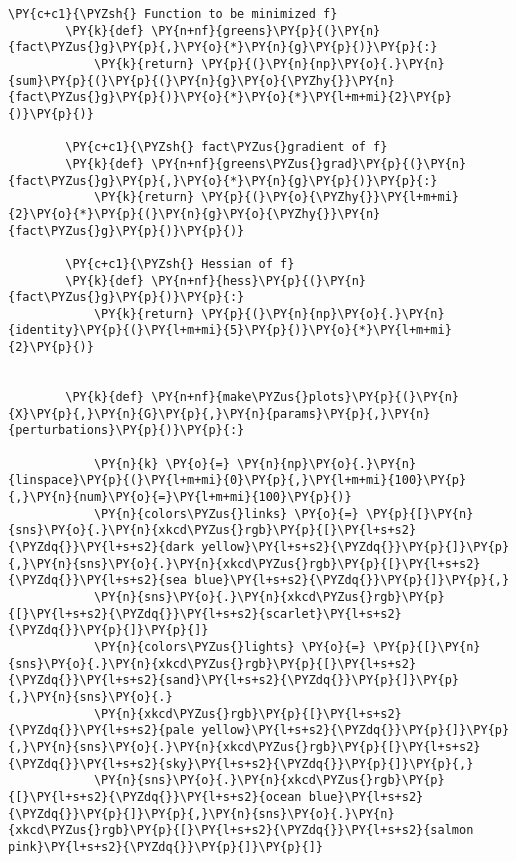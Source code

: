 \begin{Verbatim}[commandchars=\\\{\}]
        \PY{c+c1}{\PYZsh{} Function to be minimized f}
        \PY{k}{def} \PY{n+nf}{greens}\PY{p}{(}\PY{n}{fact\PYZus{}g}\PY{p}{,}\PY{o}{*}\PY{n}{g}\PY{p}{)}\PY{p}{:}
            \PY{k}{return} \PY{p}{(}\PY{n}{np}\PY{o}{.}\PY{n}{sum}\PY{p}{(}\PY{p}{(}\PY{n}{g}\PY{o}{\PYZhy{}}\PY{n}{fact\PYZus{}g}\PY{p}{)}\PY{o}{*}\PY{o}{*}\PY{l+m+mi}{2}\PY{p}{)}\PY{p}{)}
        
        \PY{c+c1}{\PYZsh{} fact\PYZus{}gradient of f}
        \PY{k}{def} \PY{n+nf}{greens\PYZus{}grad}\PY{p}{(}\PY{n}{fact\PYZus{}g}\PY{p}{,}\PY{o}{*}\PY{n}{g}\PY{p}{)}\PY{p}{:}
            \PY{k}{return} \PY{p}{(}\PY{o}{\PYZhy{}}\PY{l+m+mi}{2}\PY{o}{*}\PY{p}{(}\PY{n}{g}\PY{o}{\PYZhy{}}\PY{n}{fact\PYZus{}g}\PY{p}{)}\PY{p}{)}
        
        \PY{c+c1}{\PYZsh{} Hessian of f}
        \PY{k}{def} \PY{n+nf}{hess}\PY{p}{(}\PY{n}{fact\PYZus{}g}\PY{p}{)}\PY{p}{:}
            \PY{k}{return} \PY{p}{(}\PY{n}{np}\PY{o}{.}\PY{n}{identity}\PY{p}{(}\PY{l+m+mi}{5}\PY{p}{)}\PY{o}{*}\PY{l+m+mi}{2}\PY{p}{)}
        
        
        \PY{k}{def} \PY{n+nf}{make\PYZus{}plots}\PY{p}{(}\PY{n}{X}\PY{p}{,}\PY{n}{G}\PY{p}{,}\PY{n}{params}\PY{p}{,}\PY{n}{perturbations}\PY{p}{)}\PY{p}{:}
            
            \PY{n}{k} \PY{o}{=} \PY{n}{np}\PY{o}{.}\PY{n}{linspace}\PY{p}{(}\PY{l+m+mi}{0}\PY{p}{,}\PY{l+m+mi}{100}\PY{p}{,}\PY{n}{num}\PY{o}{=}\PY{l+m+mi}{100}\PY{p}{)}
            \PY{n}{colors\PYZus{}links} \PY{o}{=} \PY{p}{[}\PY{n}{sns}\PY{o}{.}\PY{n}{xkcd\PYZus{}rgb}\PY{p}{[}\PY{l+s+s2}{\PYZdq{}}\PY{l+s+s2}{dark yellow}\PY{l+s+s2}{\PYZdq{}}\PY{p}{]}\PY{p}{,}\PY{n}{sns}\PY{o}{.}\PY{n}{xkcd\PYZus{}rgb}\PY{p}{[}\PY{l+s+s2}{\PYZdq{}}\PY{l+s+s2}{sea blue}\PY{l+s+s2}{\PYZdq{}}\PY{p}{]}\PY{p}{,}
            \PY{n}{sns}\PY{o}{.}\PY{n}{xkcd\PYZus{}rgb}\PY{p}{[}\PY{l+s+s2}{\PYZdq{}}\PY{l+s+s2}{scarlet}\PY{l+s+s2}{\PYZdq{}}\PY{p}{]}\PY{p}{]}
            \PY{n}{colors\PYZus{}lights} \PY{o}{=} \PY{p}{[}\PY{n}{sns}\PY{o}{.}\PY{n}{xkcd\PYZus{}rgb}\PY{p}{[}\PY{l+s+s2}{\PYZdq{}}\PY{l+s+s2}{sand}\PY{l+s+s2}{\PYZdq{}}\PY{p}{]}\PY{p}{,}\PY{n}{sns}\PY{o}{.}
            \PY{n}{xkcd\PYZus{}rgb}\PY{p}{[}\PY{l+s+s2}{\PYZdq{}}\PY{l+s+s2}{pale yellow}\PY{l+s+s2}{\PYZdq{}}\PY{p}{]}\PY{p}{,}\PY{n}{sns}\PY{o}{.}\PY{n}{xkcd\PYZus{}rgb}\PY{p}{[}\PY{l+s+s2}{\PYZdq{}}\PY{l+s+s2}{sky}\PY{l+s+s2}{\PYZdq{}}\PY{p}{]}\PY{p}{,}
            \PY{n}{sns}\PY{o}{.}\PY{n}{xkcd\PYZus{}rgb}\PY{p}{[}\PY{l+s+s2}{\PYZdq{}}\PY{l+s+s2}{ocean blue}\PY{l+s+s2}{\PYZdq{}}\PY{p}{]}\PY{p}{,}\PY{n}{sns}\PY{o}{.}\PY{n}{xkcd\PYZus{}rgb}\PY{p}{[}\PY{l+s+s2}{\PYZdq{}}\PY{l+s+s2}{salmon pink}\PY{l+s+s2}{\PYZdq{}}\PY{p}{]}\PY{p}{]}
            

\end{Verbatim}
